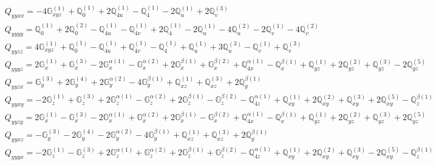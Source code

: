 \documentclass[fleqn,8pt,landscape]{jsarticle}
\begin{document}
\begin{align*}
& Q_{yyxx} = - 4 \mathbb{G}_{xyz}^{(1)} + \mathbb{Q}_{0}^{(1)} + 2 \mathbb{Q}_{4u}^{(1)} - \mathbb{Q}_{4}^{(1)} - 2 \mathbb{Q}_{u}^{(1)} + 2 \mathbb{Q}_{v}^{(3)} \\
& Q_{yyyy} = \mathbb{Q}_{0}^{(1)} + 2 \mathbb{Q}_{0}^{(2)} - \mathbb{Q}_{4u}^{(1)} - \mathbb{Q}_{4v}^{(1)} + 2 \mathbb{Q}_{4}^{(1)} - 2 \mathbb{Q}_{u}^{(1)} - 4 \mathbb{Q}_{u}^{(2)} - 2 \mathbb{Q}_{v}^{(1)} - 4 \mathbb{Q}_{v}^{(2)} \\
& Q_{yyzz} = 4 \mathbb{G}_{xyz}^{(1)} + \mathbb{Q}_{0}^{(1)} - \mathbb{Q}_{4u}^{(1)} + \mathbb{Q}_{4v}^{(1)} - \mathbb{Q}_{4}^{(1)} + \mathbb{Q}_{u}^{(1)} + 3 \mathbb{Q}_{u}^{(3)} - \mathbb{Q}_{v}^{(1)} + \mathbb{Q}_{v}^{(3)} \\
& Q_{yyyz} = 2 \mathbb{G}_{x}^{(1)} + \mathbb{G}_{x}^{(3)} - 2 \mathbb{G}_{x}^{\alpha(1)} - \mathbb{G}_{x}^{\alpha(2)} + 2 \mathbb{G}_{x}^{\beta(1)} + \mathbb{G}_{x}^{\beta(2)} + \mathbb{Q}_{4x}^{\alpha(1)} - \mathbb{Q}_{x}^{\beta(1)} + \mathbb{Q}_{yz}^{(1)} + 2 \mathbb{Q}_{yz}^{(2)} + \mathbb{Q}_{yz}^{(3)} - 2 \mathbb{Q}_{yz}^{(5)} \\
& Q_{yyzx} = \mathbb{G}_{y}^{(3)} + 2 \mathbb{G}_{y}^{(4)} + 2 \mathbb{G}_{y}^{\alpha(2)} - 4 \mathbb{G}_{y}^{\beta(1)} + \mathbb{Q}_{xz}^{(1)} + \mathbb{Q}_{xz}^{(3)} + 2 \mathbb{Q}_{y}^{\beta(1)} \\
& Q_{yyxy} = - 2 \mathbb{G}_{z}^{(1)} + \mathbb{G}_{z}^{(3)} + 2 \mathbb{G}_{z}^{\alpha(1)} - \mathbb{G}_{z}^{\alpha(2)} + 2 \mathbb{G}_{z}^{\beta(1)} - \mathbb{G}_{z}^{\beta(2)} - \mathbb{Q}_{4z}^{\alpha(1)} + \mathbb{Q}_{xy}^{(1)} + 2 \mathbb{Q}_{xy}^{(2)} + \mathbb{Q}_{xy}^{(3)} + 2 \mathbb{Q}_{xy}^{(5)} - \mathbb{Q}_{z}^{\beta(1)} \\
& Q_{yyzy} = 2 \mathbb{G}_{x}^{(1)} - \mathbb{G}_{x}^{(3)} - 2 \mathbb{G}_{x}^{\alpha(1)} + \mathbb{G}_{x}^{\alpha(2)} + 2 \mathbb{G}_{x}^{\beta(1)} - \mathbb{G}_{x}^{\beta(2)} + \mathbb{Q}_{4x}^{\alpha(1)} - \mathbb{Q}_{x}^{\beta(1)} + \mathbb{Q}_{yz}^{(1)} + 2 \mathbb{Q}_{yz}^{(2)} + \mathbb{Q}_{yz}^{(3)} + 2 \mathbb{Q}_{yz}^{(5)} \\
& Q_{yyxz} = - \mathbb{G}_{y}^{(3)} - 2 \mathbb{G}_{y}^{(4)} - 2 \mathbb{G}_{y}^{\alpha(2)} - 4 \mathbb{G}_{y}^{\beta(1)} + \mathbb{Q}_{xz}^{(1)} + \mathbb{Q}_{xz}^{(3)} + 2 \mathbb{Q}_{y}^{\beta(1)} \\
& Q_{yyyx} = - 2 \mathbb{G}_{z}^{(1)} - \mathbb{G}_{z}^{(3)} + 2 \mathbb{G}_{z}^{\alpha(1)} + \mathbb{G}_{z}^{\alpha(2)} + 2 \mathbb{G}_{z}^{\beta(1)} + \mathbb{G}_{z}^{\beta(2)} - \mathbb{Q}_{4z}^{\alpha(1)} + \mathbb{Q}_{xy}^{(1)} + 2 \mathbb{Q}_{xy}^{(2)} + \mathbb{Q}_{xy}^{(3)} - 2 \mathbb{Q}_{xy}^{(5)} - \mathbb{Q}_{z}^{\beta(1)} \\

\end{align*}
\end{document}

